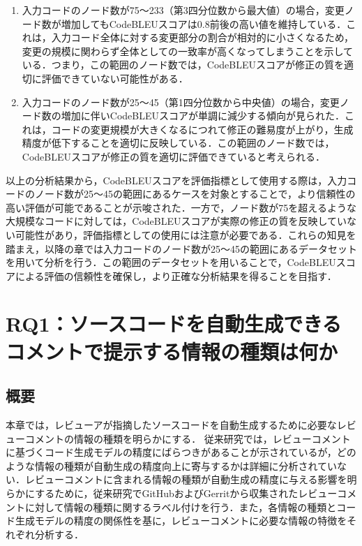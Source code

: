 \documentclass[11pt]{jreport}
\newcommand{\RQone}{ソースコードを自動生成できるコメントで提示する情報の種類は何か}
\begin{document}
\begin{enumerate}
   \item 入力コードのノード数が75〜233（第3四分位数から最大値）の場合，変更ノード数が増加してもCodeBLEUスコアは0.8前後の高い値を維持している．これは，入力コード全体に対する変更部分の割合が相対的に小さくなるため，変更の規模に関わらず全体としての一致率が高くなってしまうことを示している．つまり，この範囲のノード数では，CodeBLEUスコアが修正の質を適切に評価できていない可能性がある．
   
   \item 入力コードのノード数が25〜45（第1四分位数から中央値）の場合，変更ノード数の増加に伴いCodeBLEUスコアが単調に減少する傾向が見られた．これは，コードの変更規模が大きくなるにつれて修正の難易度が上がり，生成精度が低下することを適切に反映している．この範囲のノード数では，CodeBLEUスコアが修正の質を適切に評価できていると考えられる．
\end{enumerate}

以上の分析結果から，CodeBLEUスコアを評価指標として使用する際は，入力コードのノード数が25〜45の範囲にあるケースを対象とすることで，より信頼性の高い評価が可能であることが示唆された．一方で，ノード数が75を超えるような大規模なコードに対しては，CodeBLEUスコアが実際の修正の質を反映していない可能性があり，評価指標としての使用には注意が必要である．これらの知見を踏まえ，以降の章では入力コードのノード数が25〜45の範囲にあるデータセットを用いて分析を行う．この範囲のデータセットを用いることで，CodeBLEUスコアによる評価の信頼性を確保し，より正確な分析結果を得ることを目指す．


\chapter{RQ1：\RQone}\label{chap:fig-tab-exp}

\section{概要}
本章では，レビューアが指摘したソースコードを自動生成するために必要なレビューコメントの情報の種類を明らかにする．
従来研究では，レビューコメントに基づくコード生成モデルの精度にばらつきがあることが示されているが，どのような情報の種類が自動生成の精度向上に寄与するかは詳細に分析されていない．レビューコメントに含まれる情報の種類が自動生成の精度に与える影響を明らかにするために，従来研究でGitHubおよびGerritから収集されたレビューコメントに対して情報の種類に関するラベル付けを行う．また，各情報の種類とコード生成モデルの精度の関係性を基に，レビューコメントに必要な情報の特徴をそれぞれ分析する．
\end{document}

